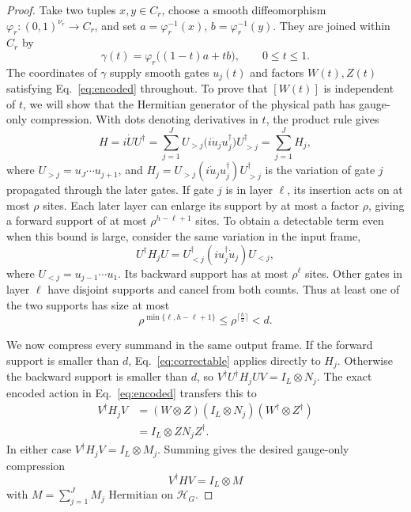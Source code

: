 \documentclass[aps,prl,reprint,notitlepage,nofootinbib,nobibnotes]{revtex4-2}
\newcommand{\HH}{\mathcal H}
\newcommand{\id}{I}
\begin{document}
\begin{proof}
Take two tuples \(x,y\in C_r\), choose a smooth diffeomorphism
\(\varphi_r:(0,1)^{\nu_r}\to C_r\), and set
\(a=\varphi_r^{-1}(x)\), \(b=\varphi_r^{-1}(y)\).
They are joined within \(C_r\) by
\begin{equation}\label{eq:cellpath}
  \gamma(t)=\varphi_r\bigl((1-t)a+tb\bigr),
  \qquad 0\le t\le1.
\end{equation}
The coordinates of \(\gamma\) supply smooth gates \(u_j(t)\) and factors
\(W(t),Z(t)\) satisfying Eq.~\eqref{eq:encoded} throughout.
To prove that \([W(t)]\) is independent of \(t\), we will show that the
Hermitian generator of the physical path has gauge-only compression.
With dots denoting derivatives in \(t\), the product rule gives
\begin{equation}\label{eq:generator}
  H=i\dot U U^\dagger
   =\sum_{j=1}^{J}
      U_{>j}\bigl(i\dot u_j u_j^\dagger\bigr)U_{>j}^\dagger=\sum_{j=1}^{J}H_j,
\end{equation}
where \(U_{>j}=u_J\cdots u_{j+1}\), and
\(H_j=U_{>j}(i\dot u_j u_j^\dagger)U_{>j}^\dagger\)
is the variation of gate \(j\) propagated through the later gates.
If gate \(j\) is in layer \(\ell\), its insertion acts on at most
\(\rho\) sites. Each later layer can enlarge its support by at most a
factor \(\rho\), giving a forward support of at most
\(\rho^{h-\ell+1}\) sites.
To obtain a detectable term even when this bound is large, consider
the same variation in the input frame,
\[
  U^\dagger H_jU
   =U_{<j}^\dagger(iu_j^\dagger\dot u_j)U_{<j},
\]
where \(U_{<j}=u_{j-1}\cdots u_1\).
Its backward support has at most \(\rho^\ell\) sites.
Other gates in layer \(\ell\) have disjoint supports and cancel from
both counts. Thus at least one of the two supports has size at most
\[
  \rho^{\min\{\ell,h-\ell+1\}}
  \le \rho^{\lceil \frac{h}{2}\rceil}<d.
\]

We now compress every summand in the same output frame.
If the forward support is smaller than \(d\),
Eq.~\eqref{eq:correctable} applies directly to \(H_j\).
Otherwise the backward support is smaller than \(d\), so
\(V^\dagger U^\dagger H_jUV=\id_L\otimes N_j\).
The exact encoded action in Eq.~\eqref{eq:encoded} transfers this to
\begin{align*}
 V^\dagger H_jV
  &=(W\otimes Z)(\id_L\otimes N_j)(W^\dagger\otimes Z^\dagger)\\
  &=\id_L\otimes ZN_jZ^\dagger.
\end{align*}
In either case \(V^\dagger H_jV=\id_L\otimes M_j\).
Summing gives the desired gauge-only compression
\begin{equation}\label{eq:compression}
  V^\dagger H V=\id_L\otimes M
\end{equation}
with \(M=\sum_{j=1}^{J}M_j\) Hermitian on \(\HH_G\).


\end{proof}
\end{document}
